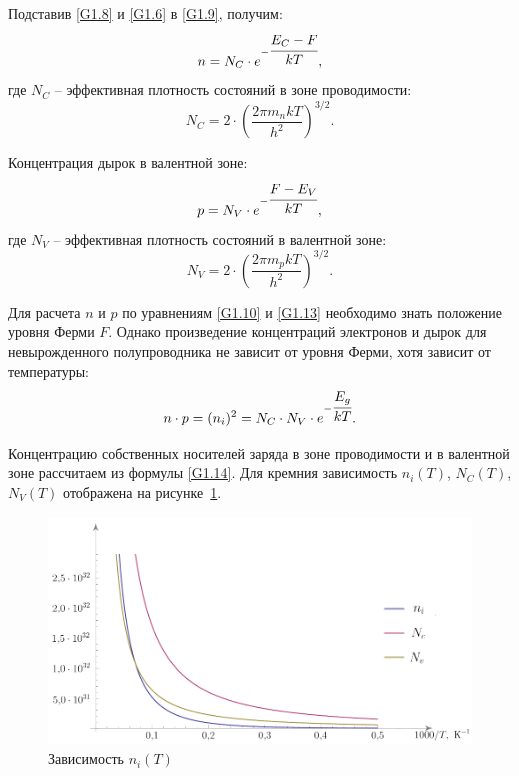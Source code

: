 \documentclass[14pt,a4paper]{extarticle}
\begin{document}
  Подставив \eqref{G1.8} и \eqref{G1.6} в \eqref{G1.9}, получим:
  \begin{equation}
    n = N_C\cdot e^{-\cfrac{E_C - F}{kT}},
    \label{G1.10}
  \end{equation}
  где \( N_C \) -- эффективная плотность состояний в зоне проводимости:
  \[
    N_C = 2\cdot\left( \frac{2\pi m_n kT}{h^2} \right)^{3/2}.
  \]

  Концентрация дырок в валентной зоне:
  \begin{equation}
    p = N_V\cdot e^{-\cfrac{F - E_V}{kT}},
    \label{G1.13}
  \end{equation}
  где \( N_V \) -- эффективная плотность состояний в валентной зоне:
  \[
    N_V = 2\cdot\left( \frac{2\pi m_p kT}{h^2} \right)^{3/2}.
  \]

  Для расчета \( n \) и \( p \) по уравнениям \eqref{G1.10} и \eqref{G1.13}
  необходимо знать положение уровня Ферми \( F \). Однако произведение
  концентраций электронов и дырок для невырожденного полупроводника не зависит
  от уровня Ферми, хотя зависит от температуры:
  \begin{equation}
    n\cdot p = (n_i)^2 = N_C\cdot N_V\cdot e^{-\cfrac{E_g}{kT}}.
    \label{G1.14}
  \end{equation}

  Концентрацию собственных носителей заряда в зоне проводимости и в валентной
  зоне рассчитаем из формулы \eqref{G1.14}. Для кремния зависимость
  \( n_i(T) \), \( N_C(T) \), \( N_V(T) \) отображена на рисунке~\ref{picNi}.
  \begin{figure}[ht]
    \includegraphics[width=.75\textwidth]{n(i)}
    \caption{Зависимость \( n_i(T) \)}
    \label{picNi}
  \end{figure}
\end{document}
